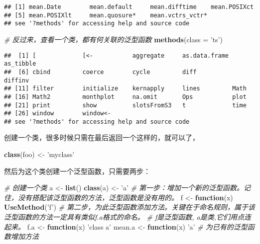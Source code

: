 \documentclass[
]{book}
\newenvironment{Shaded}{\begin{snugshade}}{\end{snugshade}}
\newcommand{\CommentTok}[1]{\textcolor[rgb]{0.56,0.35,0.01}{\textit{#1}}}
\newcommand{\ControlFlowTok}[1]{\textcolor[rgb]{0.13,0.29,0.53}{\textbf{#1}}}
\newcommand{\DataTypeTok}[1]{\textcolor[rgb]{0.13,0.29,0.53}{#1}}
\newcommand{\KeywordTok}[1]{\textcolor[rgb]{0.13,0.29,0.53}{\textbf{#1}}}
\newcommand{\NormalTok}[1]{#1}
\newcommand{\StringTok}[1]{\textcolor[rgb]{0.31,0.60,0.02}{#1}}
\begin{document}
\begin{verbatim}
## [1] mean.Date        mean.default     mean.difftime    mean.POSIXct    
## [5] mean.POSIXlt     mean.quosure*    mean.vctrs_vctr*
## see '?methods' for accessing help and source code
\end{verbatim}

\begin{Shaded}
\begin{Highlighting}[]
\CommentTok{# 反过来，查看一个类，都有何关联的泛型函数}
\KeywordTok{methods}\NormalTok{(}\DataTypeTok{class =} \StringTok{'ts'}\NormalTok{)}
\end{Highlighting}
\end{Shaded}

\begin{verbatim}
##  [1] [             [<-           aggregate     as.data.frame as_tibble    
##  [6] cbind         coerce        cycle         diff          diffinv      
## [11] filter        initialize    kernapply     lines         Math         
## [16] Math2         monthplot     na.omit       Ops           plot         
## [21] print         show          slotsFromS3   t             time         
## [26] window        window<-     
## see '?methods' for accessing help and source code
\end{verbatim}

创建一个类，很多时候只需在最后返回一个这样的，就可以了，

\begin{Shaded}
\begin{Highlighting}[]
\KeywordTok{class}\NormalTok{(foo) <-}\StringTok{ 'myclass'}   
\end{Highlighting}
\end{Shaded}

然后为这个类创建一个泛型函数，只需要两步：

\begin{Shaded}
\begin{Highlighting}[]
\CommentTok{# 创建一个类}
\NormalTok{a <-}\StringTok{ }\KeywordTok{list}\NormalTok{()}
\KeywordTok{class}\NormalTok{(a) <-}\StringTok{ 'a'}
\CommentTok{# 第一步：增加一个新的泛型函数。记住，没有搭配该泛型函数的方法，泛型函数是没有用的。}
\NormalTok{f <-}\StringTok{ }\ControlFlowTok{function}\NormalTok{(x) }\KeywordTok{UseMethod}\NormalTok{(}\StringTok{'f'}\NormalTok{) }
\CommentTok{# 第二步，为此泛型函数添加方法。关键在于命名规则，属于该泛型函数的方法一定具有类似f.a格式的命名。}
\CommentTok{# f是泛型函数, a是类,它们用点连起来。}
\NormalTok{f.a <-}\StringTok{ }\ControlFlowTok{function}\NormalTok{(x) }\StringTok{'class a'}
\NormalTok{mean.a <-}\StringTok{ }\ControlFlowTok{function}\NormalTok{(x) }\StringTok{'a'} \CommentTok{# 为已有的泛型函数增加方法}
\end{Highlighting}
\end{Shaded}
\end{document}
